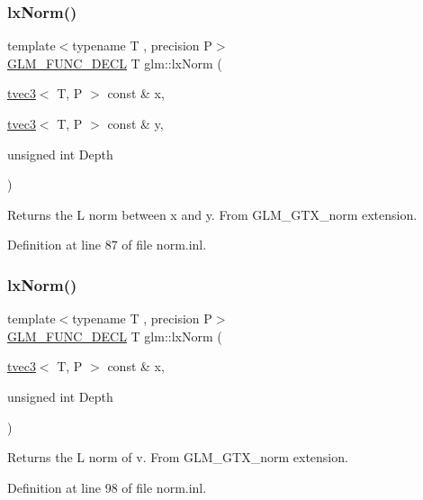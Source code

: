 \mbox{\label{group__gtx__norm_ga932bb0854e5c5a6ab5a14b023c451ca7}} 
\subsubsection{\texorpdfstring{lxNorm()}{lxNorm()}\hspace{0.1cm}{\footnotesize\ttfamily [1/2]}}
{\footnotesize\ttfamily template$<$typename T , precision P$>$ \\
\mbox{\hyperlink{setup_8hpp_ab2d052de21a70539923e9bcbf6e83a51}{G\+L\+M\+\_\+\+F\+U\+N\+C\+\_\+\+D\+E\+CL}} T glm\+::lx\+Norm (\begin{DoxyParamCaption}\item[{\mbox{\hyperlink{structglm_1_1tvec3}{tvec3}}$<$ T, P $>$ const \&}]{x,  }\item[{\mbox{\hyperlink{structglm_1_1tvec3}{tvec3}}$<$ T, P $>$ const \&}]{y,  }\item[{unsigned int}]{Depth }\end{DoxyParamCaption})}

Returns the L norm between x and y. From G\+L\+M\+\_\+\+G\+T\+X\+\_\+norm extension. 

Definition at line 87 of file norm.\+inl.

\mbox{\label{group__gtx__norm_gaab931b0d1acfe2f9c1cb78311edf24fc}} 
\subsubsection{\texorpdfstring{lxNorm()}{lxNorm()}\hspace{0.1cm}{\footnotesize\ttfamily [2/2]}}
{\footnotesize\ttfamily template$<$typename T , precision P$>$ \\
\mbox{\hyperlink{setup_8hpp_ab2d052de21a70539923e9bcbf6e83a51}{G\+L\+M\+\_\+\+F\+U\+N\+C\+\_\+\+D\+E\+CL}} T glm\+::lx\+Norm (\begin{DoxyParamCaption}\item[{\mbox{\hyperlink{structglm_1_1tvec3}{tvec3}}$<$ T, P $>$ const \&}]{x,  }\item[{unsigned int}]{Depth }\end{DoxyParamCaption})}

Returns the L norm of v. From G\+L\+M\+\_\+\+G\+T\+X\+\_\+norm extension. 

Definition at line 98 of file norm.\+inl.

